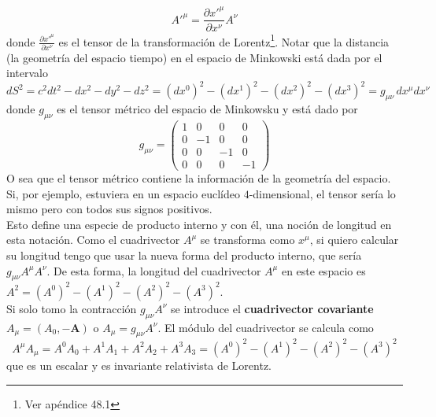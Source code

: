 \begin{equation}
    A'^{\mu} = \frac{\partial x'^{\mu}}{\partial x^{\nu}} A^{\nu}
        \label{ec:TrafoContravariante}
\end{equation}
donde $\frac{\partial x'^{\mu}}{\partial x^{\nu}}$ es el tensor de la transformación de Lorentz\footnote{Ver apéndice 48.1}. Notar que la distancia (la geometría del espacio tiempo) en el espacio de Minkowski está dada por el intervalo 
\begin{equation*}
    dS^{2} = 
    c^{2}dt^{2} - dx^{2} - dy^{2} - dz^{2} 
    = (dx^{0})^{2}-(dx^{1})^{2}-(dx^{2})^{2}-(dx^{3})^{2} 
    = g_{\mu\nu}\,dx^{\mu}dx^{\nu}    
\end{equation*}
donde $g_{\mu\nu}$ es el tensor métrico del espacio de Minkowsku y está dado por
\begin{equation*}
    g_{\mu\nu} = 
    \left(
        \begin{matrix}
            1   & 0   & 0     & 0\\
            0   & -1  & 0     & 0\\
            0   & 0   & -1    & 0\\
            0   & 0   & 0     & -1
        \end{matrix}
    \right)
\end{equation*}
O sea que el tensor métrico contiene la información de la geometría del espacio. Si, por ejemplo, estuviera en un espacio euclídeo $4$-dimensional, el tensor sería lo mismo pero con todos sus signos positivos.\\
\indent Esto define una especie de producto interno y con él, una noción de longitud en esta notación. Como el cuadrivector $A^{\mu}$ se transforma como $x^{\mu}$, si quiero calcular su longitud tengo que usar la nueva forma del producto interno, que sería $g_{\mu\nu}A^{\mu}A^{\nu}$. De esta forma, la longitud del cuadrivector $A^{\mu}$ en este espacio es $A^{2} = (A^{0})^{2}-(A^{1})^{2}-(A^{2})^{2}-(A^{3})^{2}$.\\
\indent Si solo tomo la contracción $g_{\mu\nu}A^{\nu}$ se introduce el \textbf{cuadrivector covariante} $A_{\mu} = (A_{0}, - \textbf{A})$ o $A_{\mu} = g_{\mu\nu}A^{\nu}$. El módulo del cuadrivector se calcula como
\begin{equation*}
    A^{\mu}A_{\mu} 
    = A^{0}A_{0} + A^{1}A_{1} + A^{2}A_{2} + A^{3}A_{3} 
    = (A^{0})^{2} - (A^{1})^{2} - (A^{2})^{2} - (A^{3})^{2}
\end{equation*}
que es un escalar y es invariante relativista de Lorentz.\\
